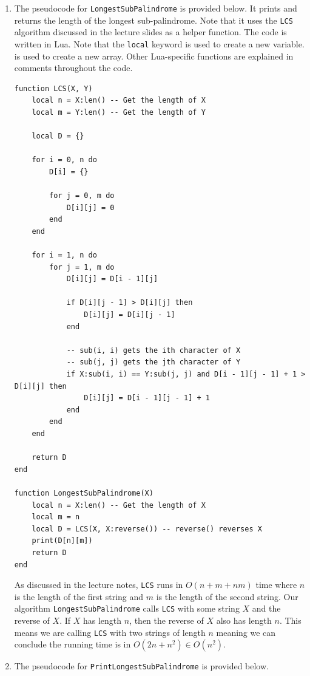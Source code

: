 \documentclass[11pt, letterpaper, titlepage]{article}
\begin{document}
\begin{enumerate}[label=\alph*.]
    \item The pseudocode for \texttt{LongestSubPalindrome} is provided below. It prints and returns the length of the longest sub-palindrome. Note that it uses the \texttt{LCS} algorithm discussed in the lecture slides as a helper function. The code is written in Lua. Note that the \texttt{local} keyword is used to create a new variable. \texttt{{}} is used to create a new array. Other Lua-specific functions are explained in comments throughout the code.
    
    {
    \footnotesize
    \begin{verbatim}
function LCS(X, Y)
    local n = X:len() -- Get the length of X
    local m = Y:len() -- Get the length of Y

    local D = {}

    for i = 0, n do
        D[i] = {}

        for j = 0, m do
            D[i][j] = 0
        end
    end

    for i = 1, n do
        for j = 1, m do
            D[i][j] = D[i - 1][j]

            if D[i][j - 1] > D[i][j] then
                D[i][j] = D[i][j - 1]
            end

            -- sub(i, i) gets the ith character of X
            -- sub(j, j) gets the jth character of Y
            if X:sub(i, i) == Y:sub(j, j) and D[i - 1][j - 1] + 1 > D[i][j] then
                D[i][j] = D[i - 1][j - 1] + 1
            end
        end
    end

    return D
end

function LongestSubPalindrome(X)
    local n = X:len() -- Get the length of X
    local m = n
    local D = LCS(X, X:reverse()) -- reverse() reverses X
    print(D[n][m])
    return D
end
    \end{verbatim}
    }

    As discussed in the lecture notes, \texttt{LCS} runs in $O(n + m + nm)$ time where $n$ is the length of the first string and $m$ is the length of the second string. Our algorithm \texttt{LongestSubPalindrome} calls \texttt{LCS} with some string $X$ and the reverse of $X$. If $X$ has length $n$, then the reverse of $X$ also has length $n$. This means we are calling \texttt{LCS} with two strings of length $n$ meaning we can conclude the running time is in $O(2n + n^2) \in O(n^2)$.

    \item The pseudocode for \texttt{PrintLongestSubPalindrome} is provided below.
    

\end{enumerate}
\end{document}

